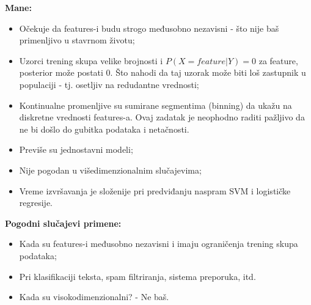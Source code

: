 \documentclass[fontsize=12bp, paper=a4]{scrarticle}
\begin{document}
\textbf{Mane:}
\begin{itemize}
    \item Očekuje da features-i budu strogo međusobno nezavisni - što nije baš primenljivo u stavrnom životu;
    \item Uzorci trening skupa velike brojnosti i $P(X = feature|Y) = 0$ za feature, posterior može postati $0$. Što nahodi da taj uzorak može biti loš zastupnik u populaciji - tj. osetljiv na redudantne vrednosti;
    \item Kontinualne promenljive su sumirane segmentima (binning) da ukažu na diskretne vrednosti features-a. Ovaj zadatak je neophodno raditi pažljivo da ne bi došlo do gubitka podataka i netačnosti.
    \item Previše su jednostavni modeli;
    \item Nije pogodan u višedimenzionalnim slučajevima;
    \item Vreme izvršavanja je složenije pri predviđanju naspram SVM i logističke regresije.
\end{itemize}





\textbf{Pogodni slučajevi primene:}
\begin{itemize}
    \item Kada su features-i međusobno nezavisni i imaju ograničenja trening skupa podataka;
    \item Pri klasifikaciji teksta, spam filtriranja, sistema preporuka, itd.
    \item Kada su visokodimenzionalni? - Ne baš.
\end{itemize}
\end{document}
